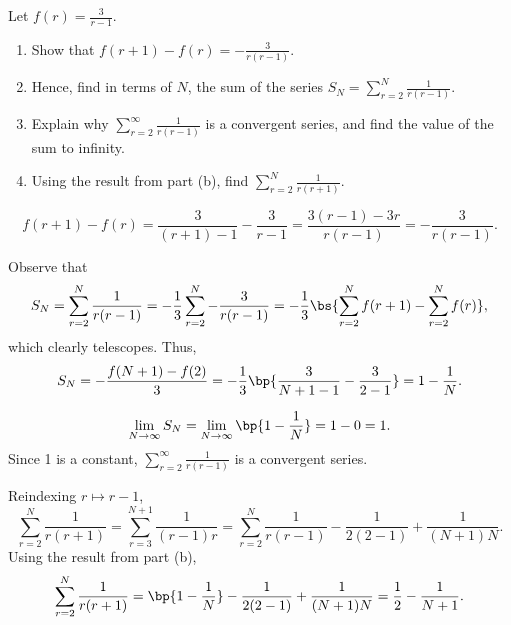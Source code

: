 \clearpage
\begin{problem}
    Let $f(r) = \frac3{r-1}$.

        \begin{enumerate}
            \item Show that $f(r+1) - f(r) = -\frac3{r(r-1)}$.
            \item Hence, find in terms of $N$, the sum of the series $S_N = \sum_{r=2}^N \frac1{r(r-1)}$.
            \item Explain why $\sum_{r=2}^\infty \frac1{r(r-1)}$ is a convergent series, and find the value of the sum to infinity.
            \item Using the result from part (b), find $\sum_{r=2}^N \frac1{r(r+1)}$.
        \end{enumerate}
\end{problem}
\begin{solution}
    \begin{ppart}
        \[f(r+1) - f(r) = \frac3{(r+1) - 1} - \frac3{r - 1} = \frac{3(r-1) - 3r}{r(r-1)} = -\frac3{r(r-1)}.\]
    \end{ppart}
    \begin{ppart}
        Observe that \[S_N = \sum_{r=2}^N \frac1{r(r-1)} = -\frac13 \sum_{r=2}^N -\frac{3}{r(r-1)} = -\frac13 \bs{\sum_{r=2}^N f(r+1) - \sum_{r=2}^N f(r)},\] which clearly telescopes. Thus, \[S_N = -\frac{f(N+1) - f(2)}3 = -\frac13 \bp{\frac3{N+1-1} - \frac3{2-1}} = 1 - \frac1N.\]
    \end{ppart}
    \begin{ppart}
        \[\lim_{N \to \infty} S_N = \lim_{N \to \infty} \bp{1 - \frac1N} = 1 - 0 = 1.\] Since 1 is a constant, $\sum_{r=2}^\infty \frac1{r(r-1)}$ is a convergent series.
    \end{ppart}
    \begin{ppart}
        Reindexing $r \mapsto r - 1$, \[\sum_{r=2}^N \frac1{r(r+1)} = \sum_{r=3}^{N+1} \frac1{(r-1)r} = \sum_{r=2}^{N} \frac1{r(r-1)} - \frac1{2(2-1)} + \frac1{(N+1)N}.\] Using the result from part (b), \[\sum_{r=2}^N \frac1{r(r+1)} = \bp{1 - \frac1N} - \frac1{2(2-1)} + \frac1{(N+1)N} = \frac12 - \frac1{N+1}.\]
    \end{ppart}
\end{solution}